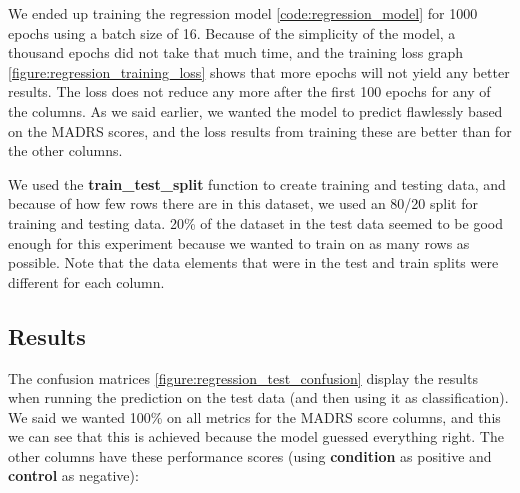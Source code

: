 We ended up training the regression model \ref{code:regression_model} for 1000 epochs using a batch size of 16. Because of the simplicity of the model, a thousand epochs did not take that much time, and the training loss graph \ref{figure:regression_training_loss} shows that more epochs will not yield any better results. The loss does not reduce any more after the first 100 epochs for any of the columns. As we said earlier, we wanted the model to predict flawlessly based on the MADRS scores, and the loss results from training these are better than for the other columns. 

We used the \textbf{train\_test\_split} function to create training and testing data, and because of how few rows there are in this dataset, 
we used an 80/20 split for training and testing data. 20\% of the dataset in the test data seemed to be good enough for this experiment because we wanted to train on as many rows as possible. Note that the data elements that were in the test and train splits were different for each column. 

\subsection{Results}

The confusion matrices \ref{figure:regression_test_confusion} display the results when running the prediction on the test data (and then using it as classification). We said we wanted 100\% on all metrics for the MADRS score columns, and this we can see that this is achieved because the model guessed everything right. The other columns have these performance scores (using \textbf{condition} as positive and \textbf{control} as negative):

